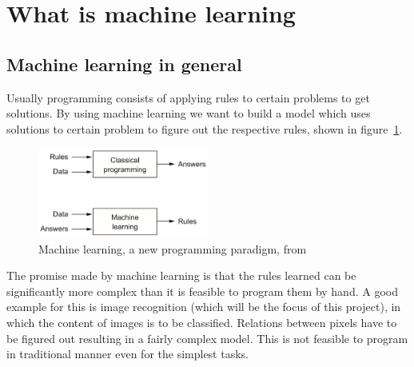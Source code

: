 \section{What is machine learning} \label{ch:what_is_ml}

\subsection{Machine learning in general}

Usually programming consists of applying rules to certain problems to get solutions.
By using machine learning we want to build a model which uses solutions to certain problem to figure out the respective rules, shown in figure~\ref{fig:cp_vs_ml}.

\begin{figure} \label{fig:cp_vs_ml}
    \centering
    \includegraphics[width=0.5\textwidth]{images/classical_prog_vs_ml.png}
    \caption{Machine learning, a new programming paradigm, from
        \cite[p.5]{Chollet2017}}
\end{figure}

The promise made by machine learning is that the rules learned can be significantly more complex than it is feasible to program them by hand.
A good example for this is image recognition (which will be the focus of this project), in which the content of images is to be classified.
Relations between pixels have to be figured out resulting in a fairly complex model.
This is not feasible to program in traditional manner even for the simplest tasks.

